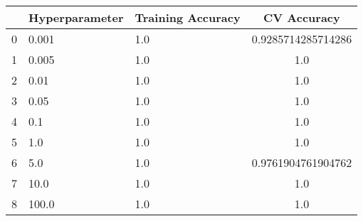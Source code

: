 \def\arraystretch{1.25}
\begin{center}
{\small
\begin{tabular}{l l l c}
\hline
\hline
&\textbf{Hyperparameter}&\textbf{Training Accuracy} & \textbf{CV Accuracy}\\
\hline
\hline
0&0.001&1.0&0.9285714285714286\\
\hline
1&0.005&1.0&1.0\\
\hline
2&0.01&1.0&1.0\\
\hline
3&0.05&1.0&1.0\\
\hline
4&0.1&1.0&1.0\\
\hline
5&1.0&1.0&1.0\\
\hline
6&5.0&1.0&0.9761904761904762\\
\hline
7&10.0&1.0&1.0\\
\hline
8&100.0&1.0&1.0\\
\hline
\end{tabular}
}
\end{center}